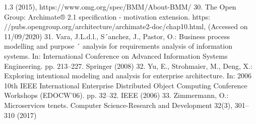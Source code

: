 1.3 (2015), https://www.omg.org/spec/BMM/About-BMM/
30. The Open Group: Archimate® 2.1 specification - motivation extension. https:
//pubs.opengroup.org/architecture/archimate2-doc/chap10.html, (Accessed
on 11/09/2020)
31. Vara, J.L.d.l., S´anchez, J., Pastor, O.: Business process modelling and purpose ´
analysis for requirements analysis of information systems. In: International Conference on Advanced Information Systems Engineering. pp. 213–227. Springer (2008)
32. Yu, E., Strohmaier, M., Deng, X.: Exploring intentional modeling and analysis for
enterprise architecture. In: 2006 10th IEEE International Enterprise Distributed
Object Computing Conference Workshops (EDOCW’06). pp. 32–32. IEEE (2006)
33. Zimmermann, O.: Microservices tenets. Computer Science-Research and Development 32(3), 301–310 (2017)